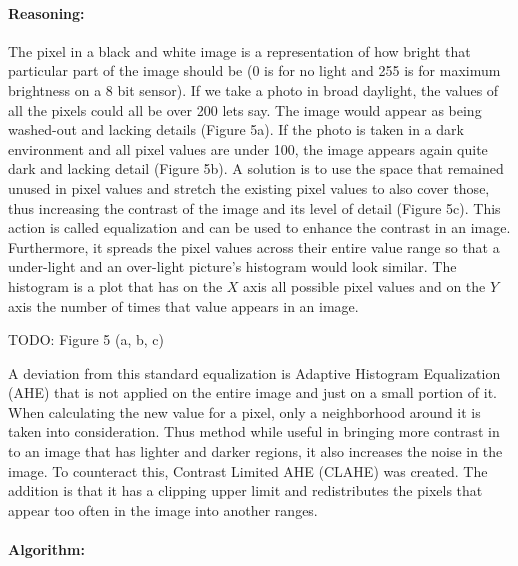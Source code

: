\paragraph*{Reasoning:}\mbox{}\par
The pixel in a black and white image is a representation of how bright that particular part of the image should be (0 is for no light and 255 is for maximum brightness on a 8 bit sensor). If we take a photo in broad daylight, the values of all the pixels could all be over 200 lets say. The image would appear as being washed-out and lacking details (Figure 5a). If the photo is taken in a dark environment and all pixel values are under 100, the image appears again quite dark and lacking detail (Figure 5b). A solution is to use the space that remained unused in pixel values and stretch the existing pixel values to also cover those, thus increasing the contrast of the image and its level of detail (Figure 5c). This action is called equalization and can be used to enhance the contrast in an image. Furthermore, it spreads the pixel values across their entire value range so that a under-light and an over-light picture's histogram would look similar. The histogram is a plot that has on the $X$ axis all possible pixel values and on the $Y$ axis the number of times that value appears in an image.

TODO: Figure 5 (a, b, c)

A deviation from this standard equalization is Adaptive Histogram Equalization (AHE) that is not applied on the entire image and just on a small portion of it. When calculating the new value for a pixel, only a neighborhood around it is taken into consideration. Thus method while useful in bringing more contrast in to an image that has lighter and darker regions, it also increases the noise in the image. To counteract this, Contrast Limited AHE (CLAHE) was created. The addition is that it has a clipping upper limit and redistributes the pixels that appear too often in the image into another ranges.

\paragraph*{Algorithm:}\mbox{}\par


